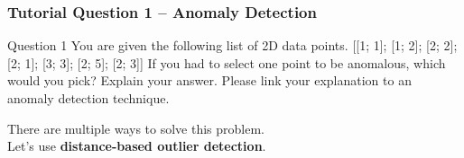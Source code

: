 \documentclass[aspectratio=169, 10pt]{beamer}
\begin{document}
\begin{frame}
    \frametitle{Tutorial Question 1 -- Anomaly Detection}
    
    \begin{block}{Question 1}
        You are given the following list of 2D data points. 
        [[1; 1]; [1; 2]; [2; 2]; [2; 1]; [3; 3]; [2; 5]; [2; 3]] If you had to select one point to be anomalous, 
        which would you pick? Explain your answer. Please link your explanation to an anomaly detection technique.
    \end{block}



    There are multiple ways to solve this problem.\\
    Let's use \textbf{distance-based outlier detection}.


\end{frame}
\end{document}
